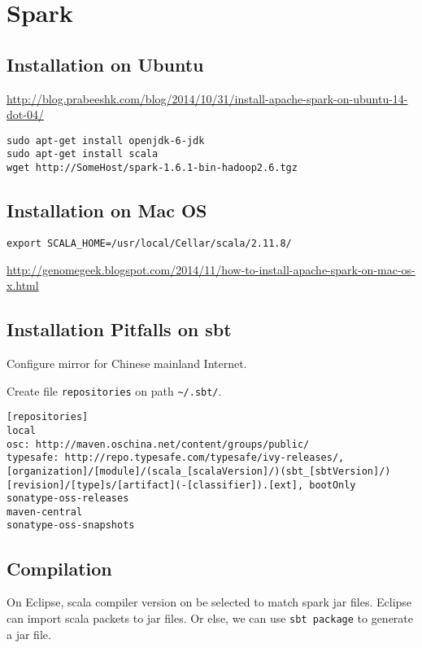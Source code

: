 \section{Spark}
\subsection{Installation on Ubuntu}

\url{http://blog.prabeeshk.com/blog/2014/10/31/install-apache-spark-on-ubuntu-14-dot-04/}

\begin{verbatim}
sudo apt-get install openjdk-6-jdk
sudo apt-get install scala
wget http://SomeHost/spark-1.6.1-bin-hadoop2.6.tgz
\end{verbatim}



\subsection{Installation on Mac OS}

\begin{verbatim}
export SCALA_HOME=/usr/local/Cellar/scala/2.11.8/
\end{verbatim}

\url{http://genomegeek.blogspot.com/2014/11/how-to-install-apache-spark-on-mac-os-x.html}

\subsection{Installation Pitfalls on sbt}

Configure mirror for Chinese mainland Internet.

Create file \verb$repositories$ on path \verb$~/.sbt/$.

\begin{verbatim}
[repositories]
local
osc: http://maven.oschina.net/content/groups/public/
typesafe: http://repo.typesafe.com/typesafe/ivy-releases/, [organization]/[module]/(scala_[scalaVersion]/)(sbt_[sbtVersion]/)[revision]/[type]s/[artifact](-[classifier]).[ext], bootOnly
sonatype-oss-releases
maven-central
sonatype-oss-snapshots
\end{verbatim}



\subsection{Compilation}
On Eclipse, scala compiler version on be selected to match spark jar files.
Eclipse can import scala packets to jar files. Or else, we can use
\verb$sbt package$ to generate a jar file.


